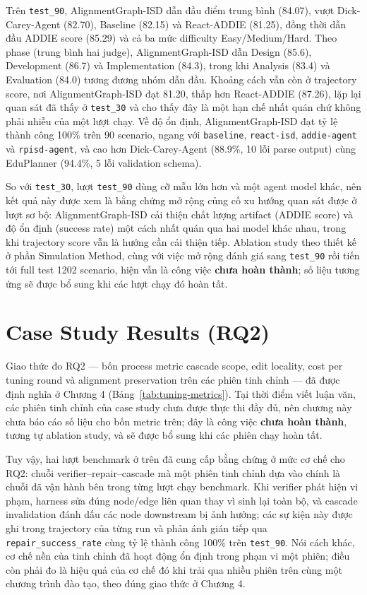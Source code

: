\documentclass[../main.tex]{subfiles}
\begin{document}
Trên \texttt{test\_90}, AlignmentGraph-ISD dẫn đầu điểm trung bình (84.07), vượt Dick-Carey-Agent (82.70), Baseline (82.15) và React-ADDIE (81.25), đồng thời dẫn đầu ADDIE score (85.29) và cả ba mức difficulty Easy/Medium/Hard. Theo phase (trung bình hai judge), AlignmentGraph-ISD dẫn Design (85.6), Development (86.7) và Implementation (84.3), trong khi Analysis (83.4) và Evaluation (84.0) tương đương nhóm dẫn đầu. Khoảng cách vẫn còn ở trajectory score, nơi AlignmentGraph-ISD đạt 81.20, thấp hơn React-ADDIE (87.26), lặp lại quan sát đã thấy ở \texttt{test\_30} và cho thấy đây là một hạn chế nhất quán chứ không phải nhiễu của một lượt chạy. Về độ ổn định, AlignmentGraph-ISD đạt tỷ lệ thành công 100\% trên 90 scenario, ngang với \texttt{baseline}, \texttt{react-isd}, \texttt{addie-agent} và \texttt{rpisd-agent}, và cao hơn Dick-Carey-Agent (88.9\%, 10 lỗi parse output) cùng EduPlanner (94.4\%, 5 lỗi validation schema).

So với \texttt{test\_30}, lượt \texttt{test\_90} dùng cỡ mẫu lớn hơn và một agent model khác, nên kết quả này được xem là bằng chứng mở rộng củng cố xu hướng quan sát được ở lượt sơ bộ: AlignmentGraph-ISD cải thiện chất lượng artifact (ADDIE score) và độ ổn định (success rate) một cách nhất quán qua hai model khác nhau, trong khi trajectory score vẫn là hướng cần cải thiện tiếp. Ablation study theo thiết kế ở phần Simulation Method, cùng với việc mở rộng đánh giá sang \texttt{test\_90} rồi tiến tới full test 1202 scenario, hiện vẫn là công việc \textbf{chưa hoàn thành}; số liệu tương ứng sẽ được bổ sung khi các lượt chạy đó hoàn tất.

\section{Case Study Results (RQ2)}

Giao thức đo RQ2 — bốn process metric cascade scope, edit locality, cost per tuning round và alignment preservation trên các phiên tinh chỉnh — đã được định nghĩa ở Chương 4 (Bảng~\ref{tab:tuning-metrics}). Tại thời điểm viết luận văn, các phiên tinh chỉnh của case study chưa được thực thi đầy đủ, nên chương này chưa báo cáo số liệu cho bốn metric trên; đây là công việc \textbf{chưa hoàn thành}, tương tự ablation study, và sẽ được bổ sung khi các phiên chạy hoàn tất.

Tuy vậy, hai lượt benchmark ở trên đã cung cấp bằng chứng ở mức cơ chế cho RQ2: chuỗi verifier--repair--cascade mà một phiên tinh chỉnh dựa vào chính là chuỗi đã vận hành bên trong từng lượt chạy benchmark. Khi verifier phát hiện vi phạm, harness sửa đúng node/edge liên quan thay vì sinh lại toàn bộ, và cascade invalidation đánh dấu các node downstream bị ảnh hưởng; các sự kiện này được ghi trong trajectory của từng run và phản ánh gián tiếp qua \texttt{repair\_success\_rate} cùng tỷ lệ thành công 100\% trên \texttt{test\_90}. Nói cách khác, cơ chế nền của tinh chỉnh đã hoạt động ổn định trong phạm vi một phiên; điều còn phải đo là hiệu quả của cơ chế đó khi trải qua nhiều phiên trên cùng một chương trình đào tạo, theo đúng giao thức ở Chương 4.
\end{document}
